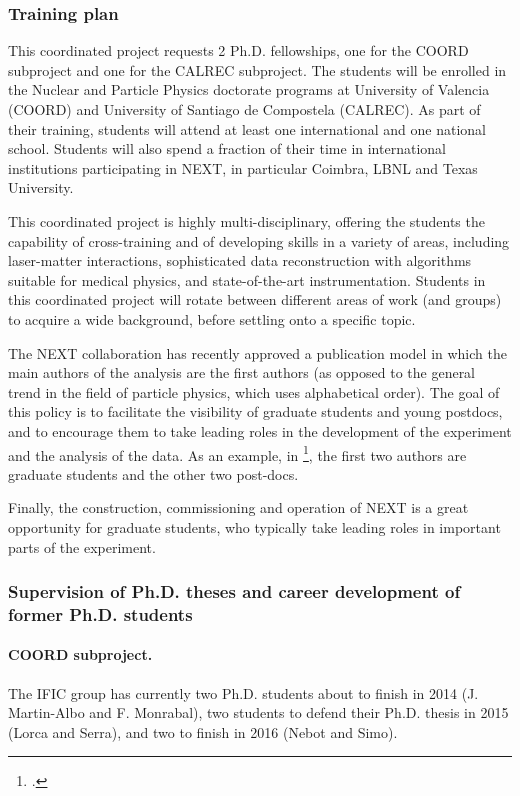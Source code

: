 \subsubsection{\label{subsubsec:training}Training plan}

This coordinated project requests 2 Ph.D. fellowships, one for the COORD subproject and one for the CALREC subproject. The students will be enrolled in the Nuclear and Particle Physics doctorate programs at University of Valencia (COORD) and University of Santiago de Compostela (CALREC). As part of their training, students will attend at least one international and one national school. Students will also spend a fraction of their time in international institutions participating in NEXT, in particular Coimbra, LBNL and Texas University. 

This coordinated project is highly multi-disciplinary, offering the students the capability of cross-training and of developing skills in a variety of areas, including laser-matter interactions, sophisticated data reconstruction with algorithms suitable for medical physics, and state-of-the-art instrumentation. Students in this coordinated project will rotate between different areas of work (and groups) to acquire a wide background, before settling onto a specific topic. 

The NEXT collaboration has recently approved a publication model in which the main authors of the analysis are the first authors (as opposed to the general trend in the field of particle physics, which uses alphabetical order). The goal of this policy is to facilitate the visibility of graduate students and young postdocs, and to encourage them to take leading roles in the development of the experiment and the analysis of the data. As an example, in \footcite{Lorca:2014sra}, the first two authors are graduate students and the other two post-docs.

Finally, the construction, commissioning and operation of NEXT is a great opportunity for graduate students, who typically take leading roles in important parts of the experiment.

\subsubsection{Supervision of Ph.D. theses and career development of former Ph.D. students}

\paragraph{COORD subproject.}
The IFIC group has currently two Ph.D. students about to finish in 2014 (J. Martin-Albo and F. Monrabal), two students to defend their Ph.D. thesis in 2015 (Lorca and Serra), and two to finish in 2016 (Nebot and Simo). 

